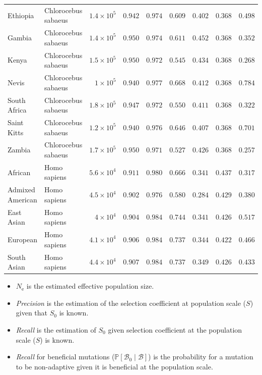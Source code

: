 \documentclass{article}
\newcommand{\Ne}{N_{\text{e}}}
\newcommand{\proba}{\mathbb{P}}
\newcommand{\Sphy}{S_{0}}
\newcommand{\SphyBen}{\mathcal{B}_0}
\newcommand{\given}{\mid}
\newcommand{\Spop}{S}
\newcommand{\SpopBen}{\mathcal{B}}
\begin{document}
\begin{center}
\begin{adjustbox}{width=\textwidth}
\begin{tabular}{||l|l|r||r|r||r|r||r|r||}
                \rowcolor{LIGHTGREY} Ethiopia & Chlorocebus sabaeus & $1.4\times 10^{5}$ & $ 0.942$ & $ 0.974$ & $ 0.609$ & $ 0.402$ & $ 0.368$ & $ 0.498$ \\
                \rowcolor{LIGHTGREY} Gambia & Chlorocebus sabaeus & $1.4\times 10^{5}$ & $ 0.950$ & $ 0.974$ & $ 0.611$ & $ 0.452$ & $ 0.368$ & $ 0.352$ \\
                \rowcolor{LIGHTGREY} Kenya & Chlorocebus sabaeus & $1.5\times 10^{5}$ & $ 0.950$ & $ 0.972$ & $ 0.545$ & $ 0.434$ & $ 0.368$ & $ 0.268$ \\
                \rowcolor{LIGHTGREY} Nevis & Chlorocebus sabaeus & $ 1\times 10^{5}$ & $ 0.940$ & $ 0.977$ & $ 0.668$ & $ 0.412$ & $ 0.368$ & $ 0.784$ \\
                \rowcolor{LIGHTGREY} South Africa & Chlorocebus sabaeus & $1.8\times 10^{5}$ & $ 0.947$ & $ 0.972$ & $ 0.550$ & $ 0.411$ & $ 0.368$ & $ 0.322$ \\
                \rowcolor{LIGHTGREY} Saint Kitts & Chlorocebus sabaeus & $1.2\times 10^{5}$ & $ 0.940$ & $ 0.976$ & $ 0.646$ & $ 0.407$ & $ 0.368$ & $ 0.701$ \\
                \rowcolor{LIGHTGREY} Zambia & Chlorocebus sabaeus & $1.7\times 10^{5}$ & $ 0.950$ & $ 0.971$ & $ 0.527$ & $ 0.426$ & $ 0.368$ & $ 0.257$ \\
                African & Homo sapiens & $5.6\times 10^{4}$ & $ 0.911$ & $ 0.980$ & $ 0.666$ & $ 0.341$ & $ 0.437$ & $ 0.317$ \\
                Admixed American & Homo sapiens & $4.5\times 10^{4}$ & $ 0.902$ & $ 0.976$ & $ 0.580$ & $ 0.284$ & $ 0.429$ & $ 0.380$ \\
                East Asian & Homo sapiens & $ 4\times 10^{4}$ & $ 0.904$ & $ 0.984$ & $ 0.744$ & $ 0.341$ & $ 0.426$ & $ 0.517$ \\
                European & Homo sapiens & $4.1\times 10^{4}$ & $ 0.906$ & $ 0.984$ & $ 0.737$ & $ 0.344$ & $ 0.422$ & $ 0.466$ \\
                South Asian & Homo sapiens & $4.4\times 10^{4}$ & $ 0.907$ & $ 0.984$ & $ 0.737$ & $ 0.349$ & $ 0.426$ & $ 0.433$ \\
                \bottomrule
            \end{tabular}
        \end{adjustbox}
    \end{center}
    \begin{itemize}
        \item $\Ne$ is the estimated effective population size.
        \item \textit{Precision} is the estimation of the selection coefficient at population scale ($\Spop$) given that $\Sphy$ is known.
        \item  \textit{Recall} is the estimation of $\Sphy$ given selection coefficient at the population scale ($\Spop$) is known.
        \item \textit{Recall} for beneficial mutations ($\proba [\SphyBen \given \SpopBen]$) is the probability for a mutation to be non-adaptive given it is beneficial at the population scale.
    \end{itemize}
\end{document}
